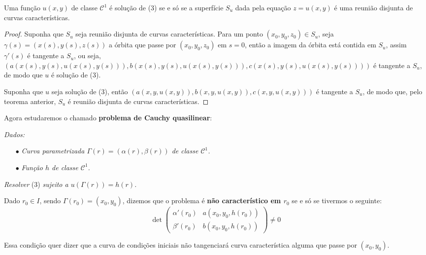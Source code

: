 \documentclass[11pt,twoside,a4paper]{book}
\begin{document}
\begin{teorema}
Uma função $u(x,y)$ de classe $\mathcal{C}^1$ é solução de (3) se e só se a superfície $S_u$ dada pela equação $z=u(x,y)$ é uma reunião disjunta de curvas características.
\end{teorema}
\begin{proof}

Suponha que $S_u$ seja reunião disjunta de curvas características. Para um ponto $(x_0,y_0,z_0)\in S_u$, seja $\gamma(s)=(x(s),y(s),z(s))$ a órbita que passe por $(x_0,y_0,z_0)$ em $s=0$, então a imagem da órbita está contida em $S_u$, assim $\gamma'(s)$ é tangente a $S_u$, ou seja, $(a(x(s),y(s),u(x(s),y(s))),b(x(s),y(s),u(x(s),y(s))),c(x(s),y(s),u(x(s),y(s))))$ é tangente a $S_u$, de modo que $u$ é solução de (3).

\smallskip
\noindent
Suponha que $u$ seja solução de (3), então $(a(x,y,u(x,y)),b(x,y,u(x,y)),c(x,y,u(x,y)))$ é tangente a $S_u$, de modo que, pelo teorema anterior, $S_u$ é reunião disjunta de curvas características.

\end{proof}

\noindent
Agora estudaremos o chamado \textbf{problema de Cauchy quasilinear}:

\smallskip
\noindent
\textit{Dados:}
\begin{enumerate}
    \item[$\bullet$] \textit{Curva parametrizada $\Gamma(r)=(\alpha(r),\beta(r))$ de classe $\mathcal{C}^1$.}
    \item[$\bullet$] \textit{Função $h$ de classe $\mathcal{C}^1$.}
\end{enumerate}

\noindent
\textit{Resolver} (3) \textit{sujeito a $u(\Gamma(r))=h(r)$.}


\bigskip
\noindent
Dado $r_0\in I$, sendo $\Gamma(r_0)=(x_0,y_0)$, dizemos que o problema é \textbf{não característico em $r_0$} se e só se tivermos o seguinte:
\begin{equation*}
    \det
    \begin{pmatrix}
    \alpha'(r_0)&a(x_0,y_0,h(r_0))\\\beta'(r_0)&b(x_0,y_0,h(r_0))
    \end{pmatrix}
    \neq 0
\end{equation*}

\smallskip
\noindent
Essa condição quer dizer que a curva de condições iniciais não tangenciará curva característica alguma que passe por $(x_0,y_0)$.
\end{document}
